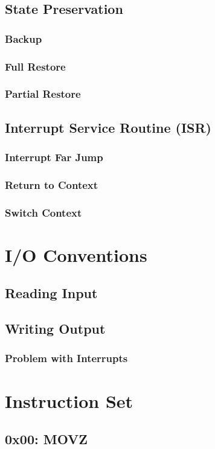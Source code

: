 \documentclass[oneside, a4paper]{memoir}
\begin{document}
\section{State Preservation}
\subsection{Backup}
\subsection{Full Restore}
\subsection{Partial Restore}
\section{Interrupt Service Routine (ISR)}
\subsection{Interrupt Far Jump}
\subsection{Return to Context}
\subsection{Switch Context}

\chapter{I/O Conventions}
\section{Reading Input}
\section{Writing Output}
\subsection{Problem with Interrupts}

\chapter{Instruction Set}
\section*{0x00: MOVZ}
\end{document}
